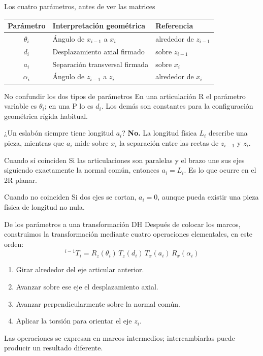 \documentclass[aspectratio=169,11pt]{beamer}
\begin{document}
\begin{frame}[t]{Los cuatro parámetros, antes de ver las matrices}
 \small
 \begin{tabular}{cll}
 \toprule
 Parámetro & Interpretación geométrica & Referencia\\\midrule
 $\theta_i$ & Ángulo de $x_{i-1}$ a $x_i$ & alrededor de $z_{i-1}$\\
 $d_i$ & Desplazamiento axial firmado & sobre $z_{i-1}$\\
 $a_i$ & Separación transversal firmada & sobre $x_i$\\
 $\alpha_i$ & Ángulo de $z_{i-1}$ a $z_i$ & alrededor de $x_i$\\
 \bottomrule
 \end{tabular}
 \pause
 \vspace{0.24cm}
 \begin{block}{No confundir los dos tipos de parámetros}
 En una articulación R el parámetro variable es $\theta_i$;
 en una P lo es $d_i$. Los demás son constantes
 para la configuración geométrica rígida habitual.
 \end{block}
\end{frame}

\begin{frame}[t]{¿Un eslabón siempre tiene longitud $a_i$?}
 \small
 \textbf{No.} La longitud física $L_i$ describe una pieza,
 mientras que $a_i$ mide sobre $x_i$ la separación entre
 las rectas de $z_{i-1}$ y $z_i$.
 \pause
 \begin{block}{Cuando sí coinciden}
 Si las articulaciones son paralelas y el brazo une sus ejes
 siguiendo exactamente la normal común, entonces $a_i=L_i$.
 Es lo que ocurre en el 2R planar.
 \end{block}
 \pause
 \begin{alertblock}{Cuando no coinciden}
 Si dos ejes se cortan, $a_i=0$, aunque pueda existir
 una pieza física de longitud no nula.
 \end{alertblock}
\end{frame}

\begin{frame}[t]{De los parámetros a una transformación DH}
 \small
 Después de colocar los marcos, construimos la transformación
 mediante cuatro operaciones elementales, en este orden:
 \[
 \boxed{{}^{i-1}T_i=R_z(\theta_i)\,T_z(d_i)\,T_x(a_i)\,R_x(\alpha_i)}
 \]
 \pause
 \begin{enumerate}
  \item Girar alrededor del eje articular anterior.
  \item Avanzar sobre ese eje el desplazamiento axial.
  \item Avanzar perpendicularmente sobre la normal común.
  \item Aplicar la torsión para orientar el eje $z_i$.
 \end{enumerate}
 \pause
 \small Las operaciones se expresan en marcos intermedios;
 intercambiarlas puede producir un resultado diferente.
\end{frame}
\end{document}
